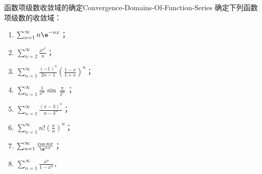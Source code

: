 \begin{problem}{函数项级数收敛域的确定}{Convergence-Domains-Of-Function-Series}
    确定下列函数项级数的收敛域：
    \begin{enumerate}
        \item $\sum_{n=1}^\infty n\e^{-nx}$；
        \item $\sum_{n=2}^\infty \frac{x^{n^2}}{n}$；
        \item $\sum_{n=1}^\infty \frac{(-1)^n}{2n - 1} \left(\frac{1 - x}{1 + x}\right)^n$；
        \item $\sum_{n=1}^\infty \frac{1}{x^n} \sin \frac{\uppi}{2^n}$；
        \item $\sum_{n=1}^\infty \frac{(x - 3)^n}{n - 3^n}$；
        \item $\sum_{n=1}^\infty n! \left(\frac{x}{n}\right)^n$；
        \item $\sum_{n=1}^\infty \frac{\cos nx}{\e^{nx}}$；
        \item $\sum_{n=1}^\infty \frac{x^n}{1 - x^n}$．
    \end{enumerate}
\end{problem}

